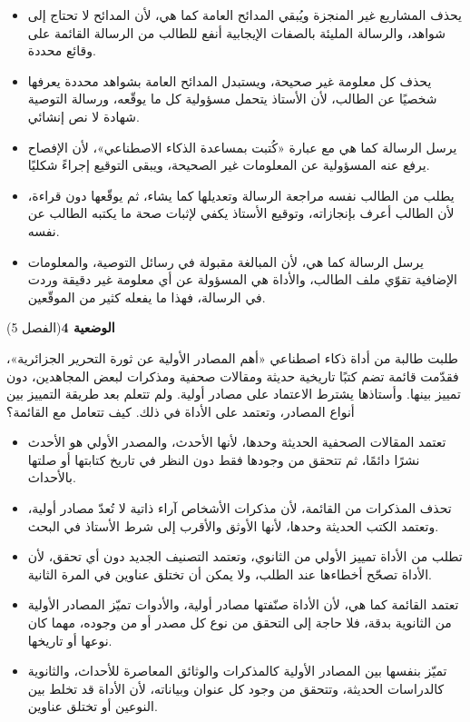 \documentclass[11pt,a4paper]{article}
\begin{document}
\begin{itemize}[leftmargin=1.0cm, labelsep=6pt, itemsep=3pt, topsep=4pt, parsep=0pt]
  \item[\textbf{أ)}] يحذف المشاريع غير المنجزة ويُبقي المدائح العامة كما هي، لأن المدائح لا تحتاج إلى شواهد، والرسالة المليئة بالصفات الإيجابية أنفع للطالب من الرسالة القائمة على وقائع محددة.
  \item[\textbf{ب)}] يحذف كل معلومة غير صحيحة، ويستبدل المدائح العامة بشواهد محددة يعرفها شخصيًا عن الطالب، لأن الأستاذ يتحمل مسؤولية كل ما يوقّعه، ورسالة التوصية شهادة لا نص إنشائي.
  \item[\textbf{ج)}] يرسل الرسالة كما هي مع عبارة «كُتبت بمساعدة الذكاء الاصطناعي»، لأن الإفصاح يرفع عنه المسؤولية عن المعلومات غير الصحيحة، ويبقى التوقيع إجراءً شكليًا.
  \item[\textbf{د)}] يطلب من الطالب نفسه مراجعة الرسالة وتعديلها كما يشاء، ثم يوقّعها دون قراءة، لأن الطالب أعرف بإنجازاته، وتوقيع الأستاذ يكفي لإثبات صحة ما يكتبه الطالب عن نفسه.
  \item[\textbf{هـ)}] يرسل الرسالة كما هي، لأن المبالغة مقبولة في رسائل التوصية، والمعلومات الإضافية تقوّي ملف الطالب، والأداة هي المسؤولة عن أي معلومة غير دقيقة وردت في الرسالة، فهذا ما يفعله كثير من الموقّعين.
\end{itemize}
\par\vspace{6pt}
\noindent
{\large\khatt\textbf{الوضعية 4}}\hfill{\small(الفصل 5)}\par\nopagebreak\vspace{3pt}
\setlength{\fboxsep}{7pt}\colorbox{gray!10}{\parbox{\dimexpr\linewidth-14pt}{طلبت طالبة من أداة ذكاء اصطناعي «أهم المصادر الأولية عن ثورة التحرير الجزائرية»، فقدّمت قائمة تضم كتبًا تاريخية حديثة ومقالات صحفية ومذكرات لبعض المجاهدين، دون تمييز بينها. وأستاذها يشترط الاعتماد على مصادر أولية. ولم تتعلم بعد طريقة التمييز بين أنواع المصادر، وتعتمد على الأداة في ذلك. كيف تتعامل مع القائمة؟}}\par\nopagebreak
\begin{itemize}[leftmargin=1.0cm, labelsep=6pt, itemsep=3pt, topsep=4pt, parsep=0pt]
  \item[\textbf{أ)}] تعتمد المقالات الصحفية الحديثة وحدها، لأنها الأحدث، والمصدر الأولي هو الأحدث نشرًا دائمًا، ثم تتحقق من وجودها فقط دون النظر في تاريخ كتابتها أو صلتها بالأحداث.
  \item[\textbf{ب)}] تحذف المذكرات من القائمة، لأن مذكرات الأشخاص آراء ذاتية لا تُعدّ مصادر أولية، وتعتمد الكتب الحديثة وحدها، لأنها الأوثق والأقرب إلى شرط الأستاذ في البحث.
  \item[\textbf{ج)}] تطلب من الأداة تمييز الأولي من الثانوي، وتعتمد التصنيف الجديد دون أي تحقق، لأن الأداة تصحّح أخطاءها عند الطلب، ولا يمكن أن تختلق عناوين في المرة الثانية.
  \item[\textbf{د)}] تعتمد القائمة كما هي، لأن الأداة صنّفتها مصادر أولية، والأدوات تميّز المصادر الأولية من الثانوية بدقة، فلا حاجة إلى التحقق من نوع كل مصدر أو من وجوده، مهما كان نوعها أو تاريخها.
  \item[\textbf{هـ)}] تميّز بنفسها بين المصادر الأولية كالمذكرات والوثائق المعاصرة للأحداث، والثانوية كالدراسات الحديثة، وتتحقق من وجود كل عنوان وبياناته، لأن الأداة قد تخلط بين النوعين أو تختلق عناوين.
\end{itemize}
\end{document}
